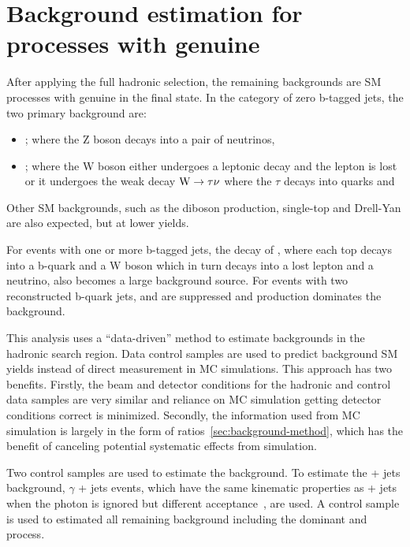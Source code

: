 \clearpage
\section{Background estimation for processes with genuine \texorpdfstring{\met}{MET}\label{sec:backgrounds}}

After applying the full hadronic selection, the remaining 
backgrounds are SM processes with genuine \met in the final state. 
In the category of zero b-tagged jets, the two primary background are:
\begin{itemize}
\item \zj; where the Z boson decays into a pair of neutrinos, 
\item \wj; where the W boson either undergoes a leptonic decay 
and the lepton is lost or it undergoes the weak decay ${\text W} \rightarrow \tau\nu$ where the $\tau$ decays into quarks and 
\end{itemize}
%
Other SM backgrounds, such as the diboson production, single-top and 
Drell-Yan are also expected, but at lower yields.

For events with one or more b-tagged jets, the decay of \ttbar, where each
top decays into a b-quark and a W boson which in turn decays into 
a lost lepton and a neutrino, also becomes a large background source.
For events with two reconstructed b-quark jets, \wj and \zj are suppressed
and \ttbar production dominates the background. 

This analysis uses a ``data-driven'' method to estimate backgrounds
in the hadronic search region. Data control samples are used to predict
background SM yields instead of direct measurement in MC simulations. 
This approach has two benefits. Firstly, the beam and detector conditions 
for the hadronic and control data samples are very similar and reliance on
MC simulation getting detector conditions correct is minimized. Secondly, 
the information used from MC simulation is largely in the form of 
ratios~\ref{sec:background-method}, which has the benefit of canceling 
potential systematic effects from simulation.

Two control samples are used to estimate the background. To estimate the
\znunu + jets background, $\gamma$ + jets events, which have the same
kinematic properties as \znunu + jets when the photon is ignored but 
different acceptance~\cite{PAS-SUS-08-002,Bern:2011pa}, are used. A \mj control
sample is used to estimated all remaining background including the 
dominant \wj and \ttbar process.

